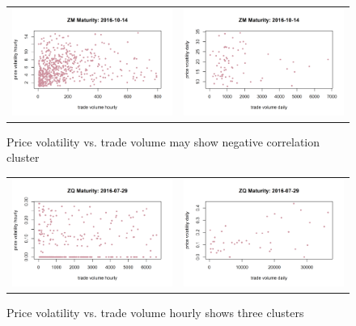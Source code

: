 \documentclass[12pt]{article}
\begin{document}
\begin{figure}[H]
	\begin{center}
		\begin{tabular}{ll}
			\includegraphics[width=8cm]{ZM2016-10-14hourly.png} &
			\includegraphics[width=8cm]{ZM2016-10-14daily.png} \\
		\end{tabular}
	\end{center}
	\caption{Price volatility vs. trade volume may show negative correlation cluster}
	\label{fig: 16}
\end{figure}


\begin{figure}[H]
	\begin{center}
		\begin{tabular}{ll}
			\includegraphics[width=8cm]{ZQ2016-07-29hourly.png} &
			\includegraphics[width=8cm]{ZQ2016-07-29daily.png} \\
		\end{tabular}
	\end{center}
	\caption{Price volatility vs. trade volume hourly shows three clusters}
	\label{fig: 17}
\end{figure}
\end{document}
